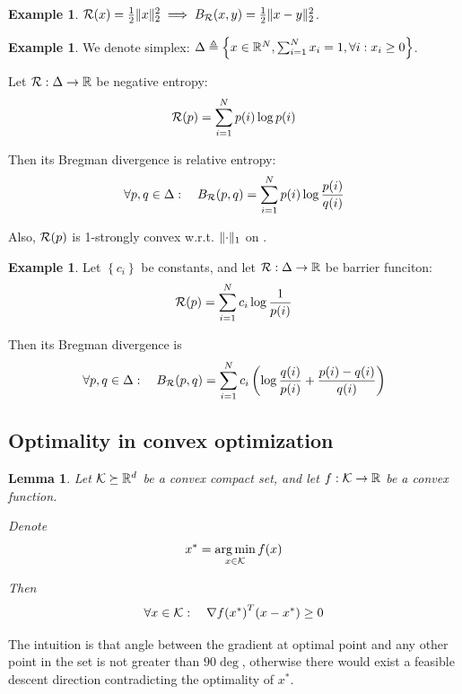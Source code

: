 \documentclass[11pt]{article}
\newtheorem{lemma}[theorem]{Lemma}
\theoremstyle{definition}
\theoremstyle{definition}
\newtheorem{example}[theorem]{Example}
\newcommand{\pth}[1]{\left( #1\right)}                 %
\newcommand{\braces}[1]{\left\lbrace #1\right\rbrace } %
\newcommand{\wrt}{w.r.t.}
\newcommand{\strongcvx}[1]{#1-strongly convex}
\newcommand{\Kset}{\ensuremath{\K}}
\begin{document}
\begin{example}
$ \mathcal R(x) = \frac{1}{2} \mathopen\| x \mathclose\|_2^2
\implies 
B_{\mathcal R}(x,y) = \frac{1}{2} \mathopen\| x - y \mathclose\|_2^2 $.
\end{example}

\begin{example}
We denote simplex: $ \simplex \triangleq \braces{ x \in \reals^N, \sum_{i=1}^{N} x_i = 1, \forall i: x_i \geq 0 } $.

Let $ \mathcal R : \Delta \to {\mathbb R} $ be negative entropy: 
$$ \mathcal R(p) = \sum_{i=1}^{N} p(i) \log p(i) $$

Then its Bregman divergence is relative entropy: 
$$\forall p,q \in \Delta:\quad B_{\mathcal R}(p,q) = \sum_{i=1}^{N} p(i) \log \frac{p(i)}{q(i)} $$

Also, $\mathcal R(p)$ is \strongcvx{1} \wrt{} $ \mathopen\| \cdot \mathclose\|_1 $ on \simplex{}.
\end{example}


\begin{example}
Let $ \braces{c_i}$ be constants, and let $ \mathcal R : \Delta \to {\mathbb R} $ be barrier funciton: 
$$ \mathcal R(p) = \sum_{i=1}^{N} c_i \log \frac{1}{p(i)} $$

Then its Bregman divergence is 
$$ \forall p,q \in \simplex:\quad B_\R(p,q) = \sum_{i=1}^{N} { c_i \pth{ \log \frac{q(i)}{p(i)} + \frac{p(i) - q(i)}{q(i)} }} $$
\end{example}

\subsection{Optimality in convex optimization}

\begin{lemma}
Let $\Kset \succeq \reals^d $ be a convex compact set, and let $ f: \Kset \to \reals $ be a convex function.

Denote 
\begin{equation*}
x^* = \argmin_{x \in \Kset} f(x)
\end{equation*}

Then
\begin{equation*}
\forall x \in \Kset: \quad {\nabla f(x^*)}^T (x-x^*) \geq 0
\end{equation*}
\end{lemma}

The intuition is that angle between the gradient at optimal point and any other point in the set is not greater than $90\deg$, otherwise there would exist a feasible descent direction contradicting the optimality of $x^*$.
\end{document}
